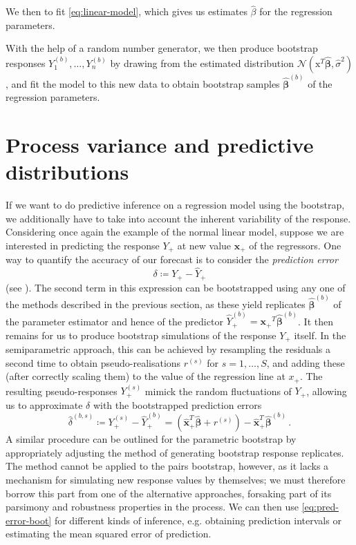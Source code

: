 \documentclass[a4paper]{book}
\begin{document}
We then  to fit \cref{eq:linear-model}, which gives us estimates $\widehat{\beta}$ for the regression parameters.

With the help of a random number generator, we then produce bootstrap responses $Y^{(b)}_1, \dots, Y^{(b)}_n$ by drawing from the estimated distribution $\mathcal{N}(\bm{\mathrm{x}}^T \widehat{\bm{\beta}}, \widehat{\sigma}^2)$, and fit the model to this new data to obtain bootstrap samples $\widehat{\bm{\beta}}^{(b)}$ of the regression parameters.

\section{Process variance and predictive distributions} \label{sec:boot-proc}

If we want to do predictive inference on a regression model using the bootstrap, we additionally have to take into account the inherent variability of the response. Considering once again the example of the normal linear model, suppose we are interested in predicting the response $Y_+$ at new value $\mathbf{x_+}$ of the regressors. One way to quantify the accuracy of our forecast is to consider the \emph{prediction error}
\begin{equation}
  \delta \coloneqq Y_+ - \widehat{Y}_+
\end{equation}
(see \cite[Algorithm 6.4]{davison}). The second term in this expression can be bootstrapped using any one of the methods described in the previous section, as these yield replicates $\widehat{\bm{\beta}}^{(b)}$ of the parameter estimator and hence of the predictor $\widehat{Y}^{(b)}_+ = \mathbf{x_+}^T \widehat{\bm{\beta}}^{(b)}$. It then remains for us to produce bootstrap simulations of the response $Y_+$ itself. In the semiparametric approach, this can be achieved by resampling the residuals a second time to obtain pseudo-realisations $r^{(s)}$ for $s = 1, \dots, S$, and adding these (after correctly scaling them) to the value of the regression line at $x_+$. The resulting pseudo-responses $Y^{(s)}_+$ mimick the random fluctuations of $Y_+$, allowing us to approximate $\delta$ with the bootstrapped prediction errors
\begin{equation} \label{eq:pred-error-boot}
  \widehat{\delta}^{(b, s)} \coloneqq Y^{(s)}_+ - \widehat{Y}^{(b)}_+ = (\widehat{\mathbf{x}}^T_+ \widehat{\bm{\beta}} + r^{(s)}) - \widehat{\mathbf{x}}^T_+ \widehat{\bm{\beta}}^{(b)} \,.
\end{equation}
A similar procedure can be outlined for the parametric bootstrap by appropriately adjusting the method of generating bootstrap response replicates. The method cannot be applied to the pairs bootstrap, however, as it lacks a mechanism for simulating new response values by themselves; we must therefore borrow this part from one of the alternative approaches, forsaking part of its parsimony and robustness properties in the process. We can then use \cref{eq:pred-error-boot} for different kinds of inference, e.g. obtaining prediction intervals or estimating the mean squared error of prediction.
\end{document}
